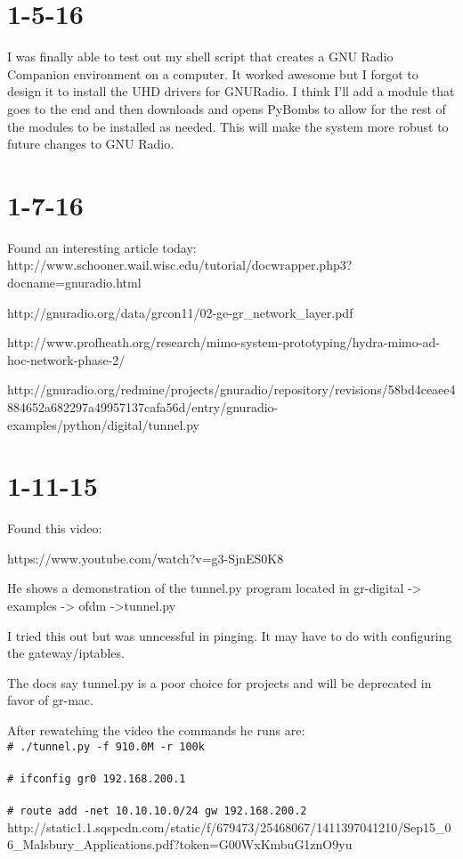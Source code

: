\documentclass{article}
\newcommand{\shellcmd}[1]{\\\indent\indent\texttt{\footnotesize\# #1}\\}
\begin{document}
{	\section{1-5-16}

	I was finally able to test out my shell script that creates a GNU Radio Companion environment on a computer. It worked awesome but I forgot to design it to install the UHD drivers for GNURadio. I think I'll add a module that goes to the end and then downloads and opens PyBombs to allow for the rest of the modules to be installed as needed. This will make the system more robust to future changes to GNU Radio. 

	\section{1-7-16}

	Found an interesting article today: http://www.schooner.wail.wisc.edu/tutorial/docwrapper.php3?docname=gnuradio.html

	http://gnuradio.org/data/grcon11/02-ge-gr\_network\_layer.pdf

	http://www.profheath.org/research/mimo-system-prototyping/hydra-mimo-ad-hoc-network-phase-2/

	http://gnuradio.org/redmine/projects/gnuradio/repository/revisions/58bd4ceaee4884652a682297a49957137cafa56d/entry/gnuradio-examples/python/digital/tunnel.py

	\section{1-11-15}

	Found this video:

	https://www.youtube.com/watch?v=g3-SjnES0K8

	He shows a demonstration of the tunnel.py program located in gr-digital -> examples -> ofdm ->tunnel.py

	I tried this out but was unncessful in pinging. It may have to do with configuring the gateway/iptables.

	The docs say tunnel.py is a poor choice for projects and will be deprecated in favor of gr-mac.

	After rewatching the video the commands he runs are:
\shellcmd{./tunnel.py -f 910.0M -r 100k}
	\shellcmd{ifconfig gr0 192.168.200.1}
	\shellcmd{route add -net 10.10.10.0/24 gw 192.168.200.2}
	
	http://static1.1.sqspcdn.com/static/f/679473/25468067/1411397041210/Sep15\_06\_Malsbury\_Applications.pdf?token=G00WxKmbuG1znO9yu%

}
\end{document}
